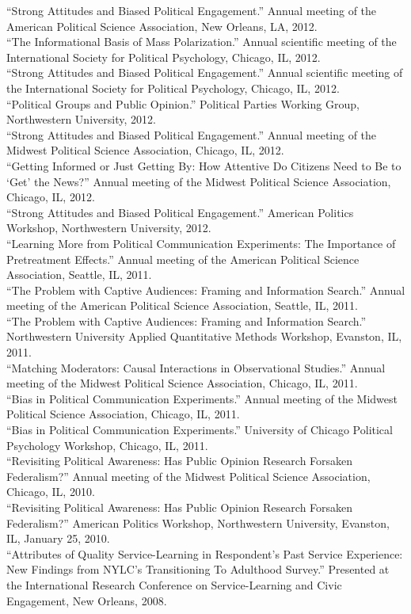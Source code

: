 \documentclass[12pt]{article}
\newcommand{\entry}[1]{\indent {\color{lg}\guillemotright}\hspace{2pt}#1\vspace{.25em}\\}
\begin{document}
\entry{``Strong Attitudes and Biased Political Engagement.'' Annual meeting of the American Political Science Association, New Orleans, LA, 2012.}
\entry{``The Informational Basis of Mass Polarization.'' Annual scientific meeting of the International Society for Political Psychology, Chicago, IL, 2012.}
\entry{``Strong Attitudes and Biased Political Engagement.'' Annual scientific meeting of the International Society for Political Psychology, Chicago, IL, 2012.}
\entry{``Political Groups and Public Opinion.'' Political Parties Working Group, Northwestern University, 2012.}
\entry{``Strong Attitudes and Biased Political Engagement.'' Annual meeting of the Midwest Political Science Association, Chicago, IL, 2012.}
\entry{``Getting Informed or Just Getting By: How Attentive Do Citizens Need to Be to `Get' the News?'' Annual meeting of the Midwest Political Science Association, Chicago, IL, 2012.}
\entry{``Strong Attitudes and Biased Political Engagement.'' American Politics Workshop, Northwestern University, 2012.}
\entry{``Learning More from Political Communication Experiments: The Importance of Pretreatment Effects.'' Annual meeting of the American Political Science Association, Seattle, IL, 2011.}
\entry{``The Problem with Captive Audiences: Framing and Information Search.'' Annual meeting of the American Political Science Association, Seattle, IL, 2011.}
\entry{``The Problem with Captive Audiences: Framing and Information Search.'' Northwestern University Applied Quantitative Methods Workshop, Evanston, IL, 2011.}
\entry{``Matching Moderators: Causal Interactions in Observational Studies.'' Annual meeting of the Midwest Political Science Association, Chicago, IL, 2011.}
\entry{``Bias in Political Communication Experiments.'' Annual meeting of the Midwest Political Science Association, Chicago, IL, 2011.}
\entry{``Bias in Political Communication Experiments.'' University of Chicago Political Psychology Workshop, Chicago, IL, 2011.}
\entry{``Revisiting Political Awareness: Has Public Opinion Research Forsaken Federalism?'' Annual meeting of the Midwest Political Science Association, Chicago, IL, 2010.}
\entry{``Revisiting Political Awareness: Has Public Opinion Research Forsaken Federalism?'' American Politics Workshop, Northwestern University, Evanston, IL, January 25, 2010.}
\entry{``Attributes of Quality Service-Learning in Respondent's Past Service Experience: New Findings from NYLC's Transitioning To Adulthood Survey.'' Presented at the International Research Conference on Service-Learning and Civic Engagement, New Orleans, 2008.}
\end{document}

